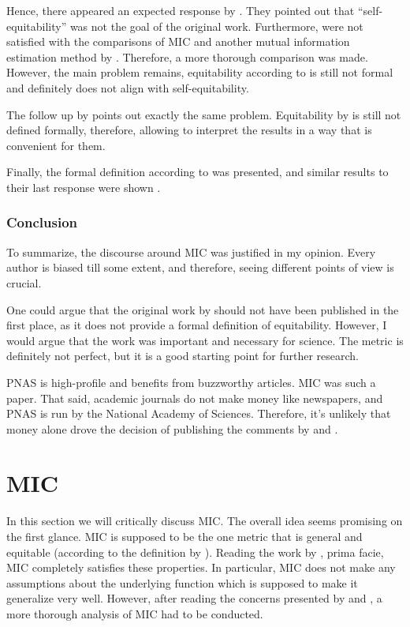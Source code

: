 \documentclass{article}
\begin{document}
\sloppy
Hence, there appeared an expected response by \cite{reshef2014}. They pointed out that ``self-equitability'' was not the goal of the original work. Furthermore, \cite{reshef2014} were not satisfied with the comparisons of MIC and another mutual information estimation method by \cite{kinney2014}. Therefore, a more thorough comparison was made. However, the main problem remains, equitability according to \cite{reshef2014} is still not formal and definitely does not align with self-equitability. 

The follow up by \cite{kinney20142} points out exactly the same problem. Equitability by \cite{reshef2014} is still not defined formally, therefore, allowing \cite{reshef2014} to interpret the results in a way that is convenient for them.

Finally, the formal definition according to \cite{reshef2015} was presented, and similar results to their last response were shown \citep{reshef2014}.

\subsubsection*{Conclusion}
To summarize, the discourse around MIC was justified in my opinion. Every author is biased till some extent, and therefore, seeing different points of view is crucial. 

One could argue that the original work by \cite{reshef2011} should not have been published in the first place, as it does not provide a formal definition of equitability. However, I would argue that the work was important and necessary for science. The metric is definitely not perfect, but it is a good starting point for further research. 

PNAS is high-profile and benefits from buzzworthy articles. MIC was such a paper. That said, academic journals do not make money like newspapers, and PNAS is run by the National Academy of Sciences. Therefore, it's unlikely that money alone drove the decision of publishing the comments by \cite{simon2014} and \cite{kinney2014}. 

\section{MIC}
In this section we will critically discuss MIC. The overall idea seems promising on the first glance. MIC is supposed to be the one metric that is general and equitable (according to the definition by \cite{reshef2011}). Reading the work by \cite{reshef2011}, prima facie, MIC completely satisfies these properties. In particular, MIC does not make any assumptions about the underlying function which is supposed to make it generalize very well. However, after reading the concerns presented by \cite{simon2014} and \cite{kinney2014}, a more thorough analysis of MIC had to be conducted.
\end{document}
